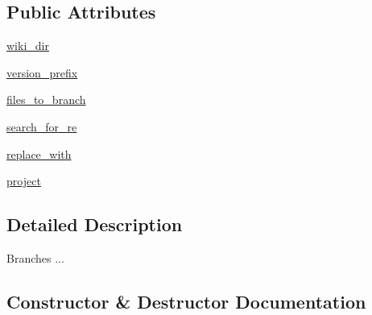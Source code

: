\subsection*{Public Attributes}
\begin{DoxyCompactItemize}
\item 
\mbox{\hyperlink{classgoogletest-master_1_1googletest_1_1scripts_1_1release__docs_1_1_wiki_brancher_a51679c5bcac2bc9a9f958be499e91e03}{wiki\+\_\+dir}}
\item 
\mbox{\hyperlink{classgoogletest-master_1_1googletest_1_1scripts_1_1release__docs_1_1_wiki_brancher_ac342f884ab3f378510805723994ee4f5}{version\+\_\+prefix}}
\item 
\mbox{\hyperlink{classgoogletest-master_1_1googletest_1_1scripts_1_1release__docs_1_1_wiki_brancher_aa1efe33febabd12b06ba660589106854}{files\+\_\+to\+\_\+branch}}
\item 
\mbox{\hyperlink{classgoogletest-master_1_1googletest_1_1scripts_1_1release__docs_1_1_wiki_brancher_abfd40eddea7462d442810d9e90a9fc69}{search\+\_\+for\+\_\+re}}
\item 
\mbox{\hyperlink{classgoogletest-master_1_1googletest_1_1scripts_1_1release__docs_1_1_wiki_brancher_a8612211a5a02a972b18cf7596f81820e}{replace\+\_\+with}}
\item 
\mbox{\hyperlink{classgoogletest-master_1_1googletest_1_1scripts_1_1release__docs_1_1_wiki_brancher_afe2c3a5c817c979900a24801eced2a2f}{project}}
\end{DoxyCompactItemize}


\subsection{Detailed Description}
\begin{DoxyVerb}Branches ...\end{DoxyVerb}
 

\subsection{Constructor \& Destructor Documentation}
\mbox{\label{classgoogletest-master_1_1googletest_1_1scripts_1_1release__docs_1_1_wiki_brancher_ac96d06932d054d883e66b5c5f7084a41}} 
